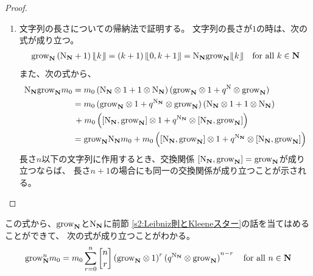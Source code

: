 {\begin{proof}
\begin{enumerate}
			が示される。
			\item 文字列の長さについての帰納法で証明する。
			文字列の長さが$1$の時は、次の式が成り立つ。
			\begin{equation*}\begin{split}
				\grow_\sizen\plr{\opN_\sizen+1}\word{k} = \plr{k+1}\word{0,k+1}
				= \opN_\sizen\grow_\sizen\word{k} \quad\text{for all } k\in\sizen
			\end{split}\end{equation*}
			また、次の式から、
			\begin{equation*}\begin{split}
				\opN_\sizen\grow_\sizen m_0 
				&= m_0\plr{\opN_\sizen\otimes1 + 1\otimes\opN_\sizen}
				\plr{\grow_\sizen\otimes1  + q^\opN\otimes\grow_\sizen} \\
				&= m_0\plr{\grow_\sizen\otimes1  + q^{\opN_\sizen}\otimes\grow_\sizen}
					\plr{\opN_\sizen\otimes1 + 1\otimes\opN_\sizen} \\
					&\,+ m_0\plrgg{\blr{\opN_\sizen,\grow_\sizen}\otimes1
					+ q^{\opN_\sizen}\otimes\blr{\opN_\sizen,\grow_\sizen}} \\
				&= \grow_\sizen\opN_\sizen m_0
					+ m_0\plrgg{\blr{\opN_\sizen,\grow_\sizen}\otimes1
					+ q^{\opN_\sizen}\otimes\blr{\opN_\sizen,\grow_\sizen}} \\
			\end{split}\end{equation*}
			長さ$n$以下の文字列に作用するとき、交換関係
			$\blr{\opN_\sizen,\grow_\sizen}=\grow_\sizen$が成り立つならば、
			長さ$n+1$の場合にも同一の交換関係が成り立つことが示される。
		\end{enumerate} %
	\end{proof} %
	この式から、$\grow_\sizen$と$\opN_\sizen$に前節
	\ref{s2:Leibniz則とKleeneスター}の話を当てはめることができて、
	次の式が成り立つことがわかる。
	\begin{equation*}\begin{split}
		\grow_\sizen^nm_0 = m_0\sum_{r=0}^n\qbinom{n}{r}
			\plr{\grow_\sizen\otimes1}^r
			\plr{q^{\opN_\sizen}\otimes\grow_\sizen}^{n-r} 
			\quad\text{for all } n\in\sizen
	\end{split}\end{equation*}
%
}\endgroup %
